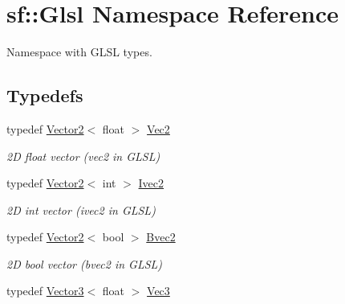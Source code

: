 \hypertarget{namespacesf_1_1_glsl}{}\section{sf\+:\+:Glsl Namespace Reference}
\label{namespacesf_1_1_glsl}


Namespace with G\+L\+SL types.  


\subsection*{Typedefs}
\begin{DoxyCompactItemize}
\item 
\mbox{\label{namespacesf_1_1_glsl_adeed356d346d87634b4c197a530e4edf}} 
typedef \hyperlink{classsf_1_1_vector2}{Vector2}$<$ float $>$ \hyperlink{namespacesf_1_1_glsl_adeed356d346d87634b4c197a530e4edf}{Vec2}
\begin{DoxyCompactList}\small\item\em 2D float vector ({\ttfamily vec2} in G\+L\+SL) \end{DoxyCompactList}\item 
\mbox{\label{namespacesf_1_1_glsl_aab803ee70c4b7bfcd63ec09e10408fd3}} 
typedef \hyperlink{classsf_1_1_vector2}{Vector2}$<$ int $>$ \hyperlink{namespacesf_1_1_glsl_aab803ee70c4b7bfcd63ec09e10408fd3}{Ivec2}
\begin{DoxyCompactList}\small\item\em 2D int vector ({\ttfamily ivec2} in G\+L\+SL) \end{DoxyCompactList}\item 
\mbox{\label{namespacesf_1_1_glsl_a59d8cf909c3d71ebf3db057480b464da}} 
typedef \hyperlink{classsf_1_1_vector2}{Vector2}$<$ bool $>$ \hyperlink{namespacesf_1_1_glsl_a59d8cf909c3d71ebf3db057480b464da}{Bvec2}
\begin{DoxyCompactList}\small\item\em 2D bool vector ({\ttfamily bvec2} in G\+L\+SL) \end{DoxyCompactList}\item 
\mbox{\label{namespacesf_1_1_glsl_a9bdd0463b7cb5316244a082007bd50f0}} 
typedef \hyperlink{classsf_1_1_vector3}{Vector3}$<$ float $>$ \hyperlink{namespacesf_1_1_glsl_a9bdd0463b7cb5316244a082007bd50f0}{Vec3}

\end{DoxyCompactItemize}
